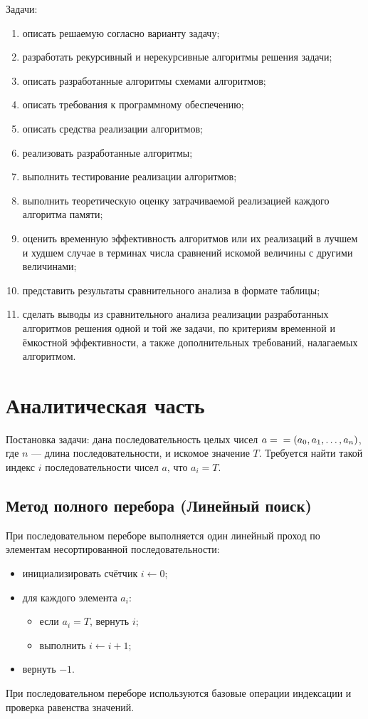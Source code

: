 \documentclass[14pt,a4paper]{extarticle}
\begin{document}
\noindent Задачи:
\begin{enumerate}
\item описать решаемую согласно варианту задачу;
\item разработать рекурсивный и нерекурсивные алгоритмы решения задачи;
\item описать разработанные алгоритмы схемами алгоритмов;
\item описать требования к программному обеспечению;
\item описать средства реализации алгоритмов;
\item реализовать разработанные алгоритмы;
\item выполнить тестирование реализации алгоритмов;
\item выполнить теоретическую оценку затрачиваемой реализацией каждого алгоритма памяти;
\item оценить временную эффективность алгоритмов или их реализаций в лучшем и худшем случае в терминах числа сравнений искомой величины с другими величинами;
\item представить результаты сравнительного анализа в формате таблицы;
\item сделать выводы из сравнительного анализа реализации разработанных алгоритмов решения одной и той же задачи, по критериям временной и ёмкостной эффективности, а также дополнительных требований, налагаемых алгоритмом.
\end{enumerate}

\clearpage\section{Аналитическая часть}
\label{sec:analysis}
Постановка задачи: дана последовательность целых чисел $a=\\=(a_0,a_1,\ldots,a_n)$, где $n$ — длина последовательности, и искомое значение $T$. Требуется найти такой индекс $i$ последовательности чисел $a$, что $a_i = T$.

\subsection{Метод полного перебора (Линейный поиск)}
При последовательном переборе выполняется один линейный проход по элементам несортированной последовательности:
\begin{itemize}
\item инициализировать счётчик $i \leftarrow 0$;
\item для каждого элемента $a_i$:
  \begin{itemize}
  \item если $a_i = T$, вернуть $i$;
  \item выполнить $i \leftarrow i + 1$;
  \end{itemize}
\item вернуть $-1$.
\end{itemize}
При последовательном переборе используются базовые операции индексации и проверка равенства значений.
\end{document}
